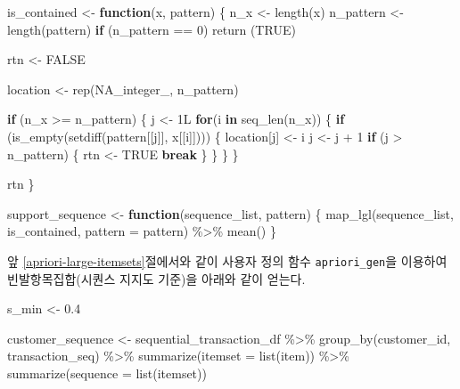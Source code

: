 \documentclass[
]{book}
\newenvironment{Shaded}{\begin{snugshade}}{\end{snugshade}}
\newcommand{\AttributeTok}[1]{\textcolor[rgb]{0.77,0.63,0.00}{#1}}
\newcommand{\ConstantTok}[1]{\textcolor[rgb]{0.00,0.00,0.00}{#1}}
\newcommand{\ControlFlowTok}[1]{\textcolor[rgb]{0.13,0.29,0.53}{\textbf{#1}}}
\newcommand{\DecValTok}[1]{\textcolor[rgb]{0.00,0.00,0.81}{#1}}
\newcommand{\FloatTok}[1]{\textcolor[rgb]{0.00,0.00,0.81}{#1}}
\newcommand{\FunctionTok}[1]{\textcolor[rgb]{0.00,0.00,0.00}{#1}}
\newcommand{\NormalTok}[1]{#1}
\newcommand{\OtherTok}[1]{\textcolor[rgb]{0.56,0.35,0.01}{#1}}
\newcommand{\SpecialCharTok}[1]{\textcolor[rgb]{0.00,0.00,0.00}{#1}}
\begin{document}
\begin{Shaded}
\begin{Highlighting}[]
\NormalTok{is\_contained }\OtherTok{\textless{}{-}} \ControlFlowTok{function}\NormalTok{(x, pattern) \{}
\NormalTok{  n\_x }\OtherTok{\textless{}{-}} \FunctionTok{length}\NormalTok{(x)}
\NormalTok{  n\_pattern }\OtherTok{\textless{}{-}} \FunctionTok{length}\NormalTok{(pattern)}
  \ControlFlowTok{if}\NormalTok{ (n\_pattern }\SpecialCharTok{==} \DecValTok{0}\NormalTok{) }\FunctionTok{return}\NormalTok{ (}\ConstantTok{TRUE}\NormalTok{)}
  
\NormalTok{  rtn }\OtherTok{\textless{}{-}} \ConstantTok{FALSE}
  
\NormalTok{  location }\OtherTok{\textless{}{-}} \FunctionTok{rep}\NormalTok{(}\ConstantTok{NA\_integer\_}\NormalTok{, n\_pattern)}

  \ControlFlowTok{if}\NormalTok{ (n\_x }\SpecialCharTok{\textgreater{}=}\NormalTok{ n\_pattern) \{}
\NormalTok{    j }\OtherTok{\textless{}{-}}\NormalTok{ 1L}
    \ControlFlowTok{for}\NormalTok{(i }\ControlFlowTok{in} \FunctionTok{seq\_len}\NormalTok{(n\_x)) \{}
      \ControlFlowTok{if}\NormalTok{ (}\FunctionTok{is\_empty}\NormalTok{(}\FunctionTok{setdiff}\NormalTok{(pattern[[j]], x[[i]]))) \{}
\NormalTok{        location[j] }\OtherTok{\textless{}{-}}\NormalTok{ i}
\NormalTok{        j }\OtherTok{\textless{}{-}}\NormalTok{ j }\SpecialCharTok{+} \DecValTok{1}
        \ControlFlowTok{if}\NormalTok{ (j }\SpecialCharTok{\textgreater{}}\NormalTok{ n\_pattern) \{}
\NormalTok{          rtn }\OtherTok{\textless{}{-}} \ConstantTok{TRUE}
          \ControlFlowTok{break}
\NormalTok{        \}}
\NormalTok{      \}}
\NormalTok{    \}}
\NormalTok{  \}}

\NormalTok{  rtn}
\NormalTok{\}}

\NormalTok{support\_sequence }\OtherTok{\textless{}{-}} \ControlFlowTok{function}\NormalTok{(sequence\_list, pattern) \{}
  \FunctionTok{map\_lgl}\NormalTok{(sequence\_list, is\_contained, }\AttributeTok{pattern =}\NormalTok{ pattern) }\SpecialCharTok{\%\textgreater{}\%} \FunctionTok{mean}\NormalTok{()}
\NormalTok{\}}
\end{Highlighting}
\end{Shaded}

앞 \ref{apriori-large-itemsets}절에서와 같이 사용자 정의 함수 \texttt{apriori\_gen}을 이용하여 빈발항목집합(시퀀스 지지도 기준)을 아래와 같이 얻는다.

\begin{Shaded}
\begin{Highlighting}[]
\NormalTok{s\_min }\OtherTok{\textless{}{-}} \FloatTok{0.4}

\NormalTok{customer\_sequence }\OtherTok{\textless{}{-}}\NormalTok{ sequential\_transaction\_df }\SpecialCharTok{\%\textgreater{}\%}
  \FunctionTok{group\_by}\NormalTok{(customer\_id, transaction\_seq) }\SpecialCharTok{\%\textgreater{}\%}
  \FunctionTok{summarize}\NormalTok{(}\AttributeTok{itemset =} \FunctionTok{list}\NormalTok{(item)) }\SpecialCharTok{\%\textgreater{}\%}
  \FunctionTok{summarize}\NormalTok{(}\AttributeTok{sequence =} \FunctionTok{list}\NormalTok{(itemset))}
\end{Highlighting}
\end{Shaded}
\end{document}
